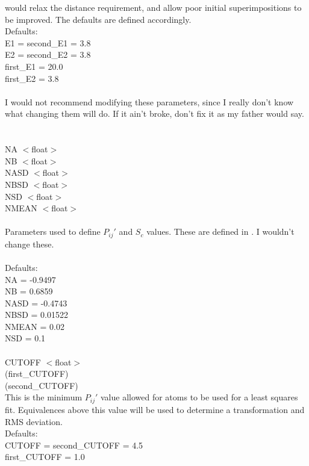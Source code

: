     would relax the distance requirement, and allow poor initial
    superimpositions to be improved.  The defaults are defined
    accordingly.
    \\
    Defaults:\\
    E1 = second\_E1 = 3.8\\
    E2 = second\_E2 = 3.8\\
    first\_E1 = 20.0\\
    first\_E2 =  3.8\\
    \\
    I would not recommend modifying these parameters, since I really
    don't know what changing them will do.  If it ain't broke, don't
    fix it as my father would say.\\
    \\
    \\
    NA    $<$float$>$\\
    NB    $<$float$>$\\
    NASD  $<$float$>$\\
    NBSD  $<$float$>$\\
    NSD   $<$float$>$\\
    NMEAN $<$float$>$\\
    \\
    Parameters used to define $P_{ij}{\prime}$ and $S_{c}$ values.  These are 
    defined in \cite{rb92b}.  I wouldn't change these. \\
    \\
    Defaults:\\
    NA    = -0.9497\\
    NB    =  0.6859\\
    NASD  = -0.4743\\
    NBSD  =  0.01522\\
    NMEAN =  0.02\\
    NSD   =  0.1\\
    \\
    CUTOFF $<$float$>$\\
    (first\_CUTOFF)\\
    (second\_CUTOFF)\\
    This is the minimum $P_{ij}{\prime}$ value allowed for atoms to be used 
    for a  least squares fit.  Equivalences above this value will be used to
    determine a transformation and RMS deviation.\\
    Defaults:\\
    CUTOFF = second\_CUTOFF = 4.5\\
    first\_CUTOFF = 1.0\\
